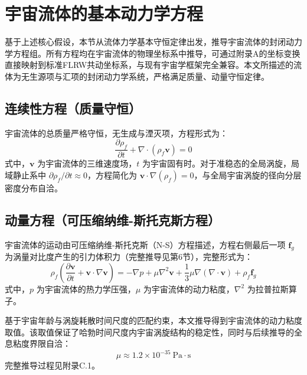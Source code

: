 \documentclass[aps,prd,preprint,superscriptaddress,floatfix]{revtex4-2}
\begin{document}
\section{宇宙流体的基本动力学方程}
基于上述核心假设，本节从流体力学基本守恒定律出发，推导宇宙流体的封闭动力学方程组。所有方程均在宇宙流体的物理坐标系中推导，可通过附录A的坐标变换直接映射到标准FLRW共动坐标系，与现有宇宙学框架完全兼容。本文所描述的流体为无生源项与汇项的封闭动力学系统，严格满足质量、动量守恒定律。

\subsection{连续性方程（质量守恒）}
宇宙流体的总质量严格守恒，无生成与湮灭项，方程形式为：
\begin{equation}
\frac{\partial \rho_{f}}{\partial t}+\nabla \cdot\left(\rho_{f} \boldsymbol{v}\right)=0
\label{eq:continuity}
\end{equation}
式中，$\boldsymbol{v}$ 为宇宙流体的三维速度场，$t$ 为宇宙固有时。对于准稳态的全局涡旋，局域静止系中 $\partial \rho_{f} / \partial t \approx 0$，方程简化为 $\boldsymbol{v} \cdot \nabla(\rho_{f})=0$，与全局宇宙涡旋的径向分层密度分布自洽。

\subsection{动量方程（可压缩纳维-斯托克斯方程）}
宇宙流体的运动由可压缩纳维-斯托克斯（N-S）方程描述，方程右侧最后一项 $\boldsymbol{f}_{g}$ 为涡量对比度产生的引力体积力（完整推导见第6节），完整形式为：
\begin{equation}
\rho_{f}\left(\frac{\partial \boldsymbol{v}}{\partial t}+\boldsymbol{v} \cdot \nabla \boldsymbol{v}\right)=-\nabla p+\mu \nabla^{2} \boldsymbol{v}+\frac{1}{3} \mu \nabla(\nabla \cdot \boldsymbol{v})+\rho_{f} \boldsymbol{f}_{g}
\label{eq:navier_stokes}
\end{equation}
式中，$p$ 为宇宙流体的热力学压强，$\mu$ 为宇宙流体的动力粘度，$\nabla^{2}$ 为拉普拉斯算子。

基于宇宙年龄与涡旋耗散时间尺度的匹配约束，本文推导得到宇宙流体的动力粘度取值。该取值保证了哈勃时间尺度内宇宙涡旋结构的稳定性，同时与后续推导的全息粘度界限自洽：
\begin{equation}
\mu \approx 1.2 \times 10^{-35} \ \text{Pa} \cdot \text{s}
\label{eq:viscosity}
\end{equation}
完整推导过程见附录C.1。
\end{document}
